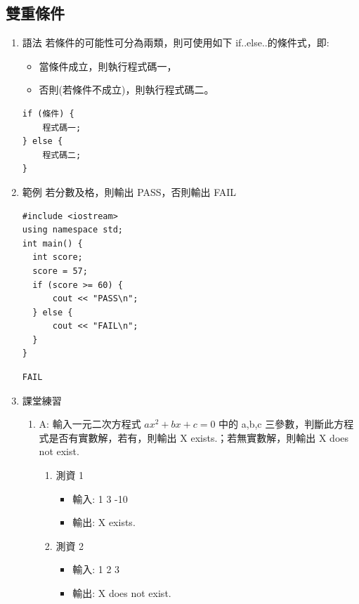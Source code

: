 \documentclass[a4paper,12pt]{article}
\begin{document}
\subsection{雙重條件}
\label{sec:orgb27c750}
\begin{enumerate}
\item 語法
\label{sec:org25399f1}
若條件的可能性可分為兩類，則可使用如下 if..else..的條件式，即:\\
\begin{itemize}
\item 當條件成立，則執行程式碼一，\\
\item 否則(若條件不成立)，則執行程式碼二。\\
\end{itemize}
\lstset{breaklines=true,language=cpp,label= ,caption= ,captionpos=b,numbers=none}
\begin{lstlisting}
if (條件) {
    程式碼一;
} else {
    程式碼二;
}
\end{lstlisting}

\item 範例
\label{sec:org29bb9d2}
若分數及格，則輸出 PASS，否則輸出 FAIL\\
\lstset{breaklines=true,language=cpp,label= ,caption= ,captionpos=b,firstnumber=1,numbers=left}
\begin{lstlisting}
#include <iostream>
using namespace std;
int main() {
  int score;
  score = 57;
  if (score >= 60) {
      cout << "PASS\n";
  } else {
      cout << "FAIL\n";
  }
}
\end{lstlisting}

\begin{verbatim}
FAIL
\end{verbatim}
\item 課堂練習
\label{sec:org28353e1}
\begin{enumerate}
\item A: 輸入一元二次方程式 \(ax^2+bx+c=0\) 中的 a,b,c 三參數，判斷此方程式是否有實數解，若有，則輸出 X exists.；若無實數解，則輸出 X does not exist.
\label{sec:org412af0d}
\begin{enumerate}
\item 測資 1
\label{sec:org8daa4ab}
\begin{itemize}
\item 輸入: 1 3 -10\\
\item 輸出: X exists.\\
\end{itemize}
\item 測資 2
\label{sec:org4c8b5c8}
\begin{itemize}
\item 輸入: 1 2 3\\
\item 輸出: X does not exist.\\
\end{itemize}
\end{enumerate}
\end{enumerate}
\end{enumerate}
\end{document}
